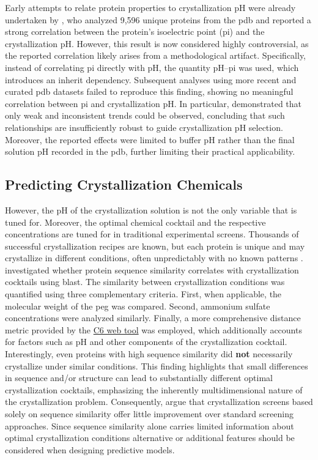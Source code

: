 Early attempts to relate protein properties to crystallization pH were already undertaken by \citet{Kantardjieff2004}, who analyzed 9,596 unique proteins from the \gls{pdb} and reported a strong correlation between the protein’s isoelectric point (\gls{pi}) and the crystallization pH. However, this result is now considered highly controversial, as the reported correlation likely arises from a methodological artifact. Specifically, instead of correlating \gls{pi} directly with pH, the quantity pH–\gls{pi} was used, which introduces an inherit dependency. Subsequent analyses using more recent and curated \gls{pdb} datasets failed to reproduce this finding, showing no meaningful correlation between \gls{pi} and crystallization pH. In particular, \citet{Kirkwood2015} demonstrated that only weak and inconsistent trends could be observed, concluding that such relationships are insufficiently robust to guide crystallization pH selection. Moreover, the reported effects were limited to buffer pH rather than the final solution pH recorded in the \gls{pdb}, further limiting their practical applicability.

\subsection*{Predicting Crystallization Chemicals}
However, the pH of the crystallization solution is not the only variable that is tuned for. Moreover, the optimal chemical cocktail and the respective concentrations are tuned for in traditional experimental screens. Thousands of successful crystallization recipes are known, but each protein is unique and may crystallize in different conditions, often unpredictably with no known patterns \citep{Zhang2022}. 
\citet{Abrahams2019} investigated whether protein sequence similarity correlates with crystallization cocktails using \gls{blast}. The similarity between crystallization conditions was quantified using three complementary criteria. First, when applicable, the molecular weight of the \gls{peg} was compared. Second, ammonium sulfate concentrations were analyzed similarly. Finally, a more comprehensive distance metric provided by the \href{https://c6.csiro.au/}{C6 web tool} \citep{Newman2010} was employed, which additionally accounts for factors such as pH and other components of the crystallization cocktail.
Interestingly, even proteins with high sequence similarity did \textbf{not} necessarily crystallize under similar conditions. This finding highlights that small differences in sequence and/or structure can lead to substantially different optimal crystallization cocktails, emphasizing the inherently multidimensional nature of the crystallization problem. Consequently, \citet{Abrahams2019} argue that crystallization screens based solely on sequence similarity offer little improvement over standard screening approaches. Since sequence similarity alone carries limited information about optimal crystallization conditions alternative or additional features should be considered when designing predictive models.

